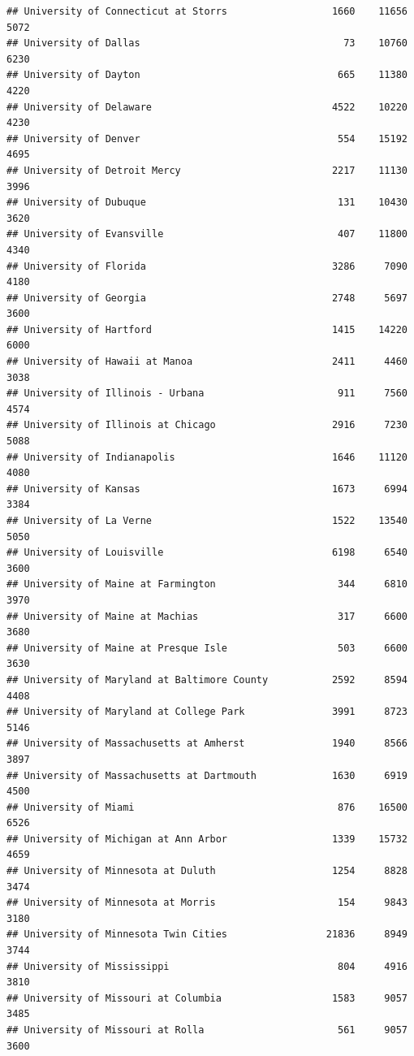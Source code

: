 \documentclass[
]{article}
\begin{document}
\begin{verbatim}
## University of Connecticut at Storrs                  1660    11656       5072
## University of Dallas                                   73    10760       6230
## University of Dayton                                  665    11380       4220
## University of Delaware                               4522    10220       4230
## University of Denver                                  554    15192       4695
## University of Detroit Mercy                          2217    11130       3996
## University of Dubuque                                 131    10430       3620
## University of Evansville                              407    11800       4340
## University of Florida                                3286     7090       4180
## University of Georgia                                2748     5697       3600
## University of Hartford                               1415    14220       6000
## University of Hawaii at Manoa                        2411     4460       3038
## University of Illinois - Urbana                       911     7560       4574
## University of Illinois at Chicago                    2916     7230       5088
## University of Indianapolis                           1646    11120       4080
## University of Kansas                                 1673     6994       3384
## University of La Verne                               1522    13540       5050
## University of Louisville                             6198     6540       3600
## University of Maine at Farmington                     344     6810       3970
## University of Maine at Machias                        317     6600       3680
## University of Maine at Presque Isle                   503     6600       3630
## University of Maryland at Baltimore County           2592     8594       4408
## University of Maryland at College Park               3991     8723       5146
## University of Massachusetts at Amherst               1940     8566       3897
## University of Massachusetts at Dartmouth             1630     6919       4500
## University of Miami                                   876    16500       6526
## University of Michigan at Ann Arbor                  1339    15732       4659
## University of Minnesota at Duluth                    1254     8828       3474
## University of Minnesota at Morris                     154     9843       3180
## University of Minnesota Twin Cities                 21836     8949       3744
## University of Mississippi                             804     4916       3810
## University of Missouri at Columbia                   1583     9057       3485
## University of Missouri at Rolla                       561     9057       3600

\end{verbatim}
\end{document}
